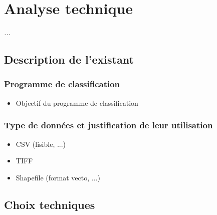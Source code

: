 \chapter[Analyse technique]{Analyse technique}

\textit{...}

\section{Description de l'existant}

\subsection{Programme de classification}
\begin{itemize}
	\item Objectif du programme de classification 
\end{itemize}

\subsection{Type de données et justification de leur utilisation}
\begin{itemize}
	\item CSV (lisible, ...)
	\item TIFF
	\item Shapefile (format vecto, ...)
\end{itemize}


\section{Choix techniques}

